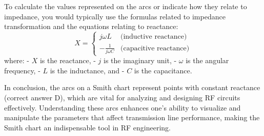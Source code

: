 To calculate the values represented on the arcs or indicate how they relate to impedance, you would typically use the formulas related to impedance transformation and the equations relating to reactance:
\[
X = \begin{cases} 
j\omega L & \text{(inductive reactance)} \\ 
-\frac{1}{j\omega C} & \text{(capacitive reactance)} 
\end{cases}
\]
where:
- \(X\) is the reactance,
- \(j\) is the imaginary unit,
- \(\omega\) is the angular frequency,
- \(L\) is the inductance, and
- \(C\) is the capacitance.

In conclusion, the arcs on a Smith chart represent points with constant reactance (correct answer D), which are vital for analyzing and designing RF circuits effectively. Understanding these arcs enhances one's ability to visualize and manipulate the parameters that affect transmission line performance, making the Smith chart an indispensable tool in RF engineering.
